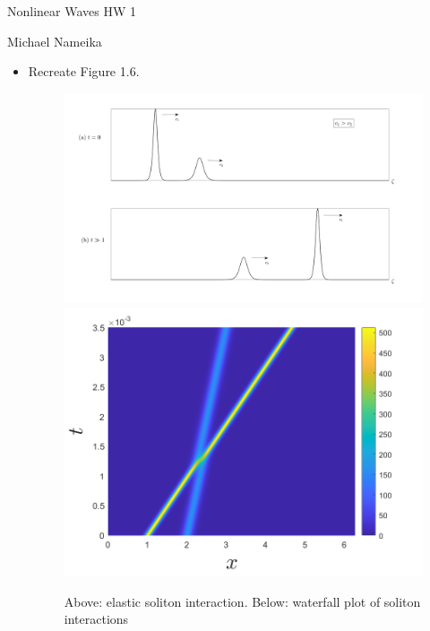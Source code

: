 \documentclass{article}
\begin{document}
\begin{center}
    {\Huge Nonlinear Waves HW 1}
    \vspace{0.5cm}

    {\Large Michael Nameika}
\end{center}


\begin{itemize}
    \item[1.] Recreate Figure 1.6.
    \newline\newline
    \begin{center}
        \begin{figure}[H]
            \includegraphics[scale = 0.25]{elastic_solitons.png}
            \includegraphics[scale = 0.5]{soliton_interaction_waterfall.png}
            \caption{Above: elastic soliton interaction. Below: waterfall plot of soliton interactions}
        \end{figure}
    \end{center}


\end{itemize}
\end{document}
